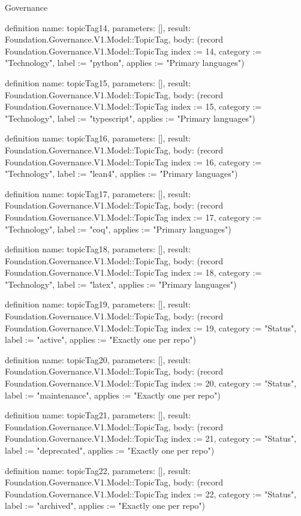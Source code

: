 \begin{lexlean}{Governance}
\begin{semanticmodule}
definition{
  name: topicTag14,
  parameters: [],
  result: Foundation.Governance.V1.Model::TopicTag,
  body: (record Foundation.Governance.V1.Model::TopicTag {index := 14, category := "Technology", label := "python", applies := "Primary languages"})
}

definition{
  name: topicTag15,
  parameters: [],
  result: Foundation.Governance.V1.Model::TopicTag,
  body: (record Foundation.Governance.V1.Model::TopicTag {index := 15, category := "Technology", label := "typescript", applies := "Primary languages"})
}

definition{
  name: topicTag16,
  parameters: [],
  result: Foundation.Governance.V1.Model::TopicTag,
  body: (record Foundation.Governance.V1.Model::TopicTag {index := 16, category := "Technology", label := "lean4", applies := "Primary languages"})
}

definition{
  name: topicTag17,
  parameters: [],
  result: Foundation.Governance.V1.Model::TopicTag,
  body: (record Foundation.Governance.V1.Model::TopicTag {index := 17, category := "Technology", label := "coq", applies := "Primary languages"})
}

definition{
  name: topicTag18,
  parameters: [],
  result: Foundation.Governance.V1.Model::TopicTag,
  body: (record Foundation.Governance.V1.Model::TopicTag {index := 18, category := "Technology", label := "latex", applies := "Primary languages"})
}

definition{
  name: topicTag19,
  parameters: [],
  result: Foundation.Governance.V1.Model::TopicTag,
  body: (record Foundation.Governance.V1.Model::TopicTag {index := 19, category := "Status", label := "active", applies := "Exactly one per repo"})
}

definition{
  name: topicTag20,
  parameters: [],
  result: Foundation.Governance.V1.Model::TopicTag,
  body: (record Foundation.Governance.V1.Model::TopicTag {index := 20, category := "Status", label := "maintenance", applies := "Exactly one per repo"})
}

definition{
  name: topicTag21,
  parameters: [],
  result: Foundation.Governance.V1.Model::TopicTag,
  body: (record Foundation.Governance.V1.Model::TopicTag {index := 21, category := "Status", label := "deprecated", applies := "Exactly one per repo"})
}

definition{
  name: topicTag22,
  parameters: [],
  result: Foundation.Governance.V1.Model::TopicTag,
  body: (record Foundation.Governance.V1.Model::TopicTag {index := 22, category := "Status", label := "archived", applies := "Exactly one per repo"})
}


\end{semanticmodule}
\end{lexlean}
